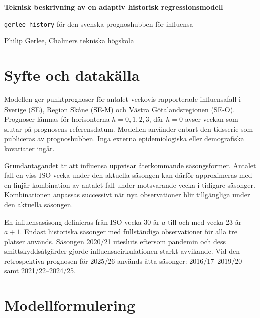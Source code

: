 \documentclass[10pt,a4paper]{article}
\newcommand{\modelname}{\texttt{gerlee-history}}
\begin{document}
\begin{center}
  {\Large\bfseries Teknisk beskrivning av en adaptiv historisk regressionsmodell}\par
  \vspace{0.3em}
  {\modelname{} för den svenska prognoshubben för influensa}\par
  \vspace{0.2em}
  Philip Gerlee, Chalmers tekniska högskola
\end{center}

\section*{Syfte och datakälla}

Modellen ger punktprognoser för antalet veckovis rapporterade influensafall i
Sverige (SE), Region Skåne (SE-M) och Västra Götalandsregionen (SE-O).
Prognoser lämnas för horisonterna $h=0,1,2,3$, där $h=0$ avser veckan som
slutar på prognosens referensdatum. Modellen använder enbart den tidsserie som
publiceras av prognoshubben. Inga externa epidemiologiska eller demografiska
kovariater ingår.

Grundantagandet är att influensa uppvisar återkommande säsongsformer. Antalet
fall en viss ISO-vecka under den aktuella säsongen kan därför approximeras med
en linjär kombination av antalet fall under motsvarande vecka i tidigare
säsonger. Kombinationen anpassas successivt när nya observationer blir
tillgängliga under den aktuella säsongen.

En influensasäsong definieras från ISO-vecka 30 år $a$ till och med vecka 23
år $a+1$. Endast historiska säsonger med fullständiga observationer för alla
tre platser används. Säsongen 2020/21 utesluts eftersom pandemin och dess
smittskyddsåtgärder gjorde influensacirkulationen starkt avvikande. Vid den
retrospektiva prognosen för 2025/26 används åtta säsonger: 2016/17--2019/20
samt 2021/22--2024/25.

\section*{Modellformulering}
\end{document}
